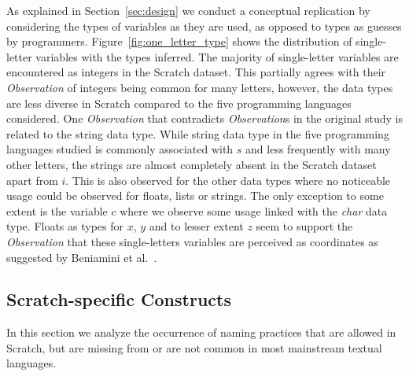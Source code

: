 \documentclass[conference]{IEEEtran}
\begin{document}
As explained in Section~\ref{sec:design} we conduct a conceptual replication by considering the types of variables as they are used, as opposed to types as guesses by programmers.
Figure~\ref{fig:one_letter_type} shows the distribution of single-letter variables with the types inferred. 
The majority of single-letter variables are encountered as integers in the Scratch dataset. This partially agrees with their \emph{Observation} of integers being common for many letters, however, the data types  are less diverse in Scratch compared to the five programming languages considered.
One \emph{Observation} that contradicts \emph{Observation}s in the original study is related to the string data type. While string data type in the five programming languages studied is commonly associated with $s$ and less frequently with many other letters, the strings are almost completely absent in the Scratch dataset apart from $i$. This is also observed for the other data types where no noticeable usage could be observed for floats, lists or strings. The only exception to some extent is the variable $c$ where we observe some usage linked with the \emph{char} data type. 
Floats as types for $x$, $y$ and to lesser extent $z$ seem to support the \emph{Observation} that these single-letters variables are perceived as coordinates as suggested by Beniamini et al.~\cite{Beniamini}.

\subsection{Scratch-specific Constructs}
\label{res:Scratch:specific}
In this section we analyze the occurrence of naming practices that are allowed in Scratch, but are missing from or are not common in most mainstream textual languages.
\end{document}
